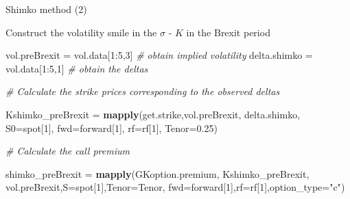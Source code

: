 \documentclass[ignorenonframetext,aspectratio=169]{beamer}
\newenvironment{Shaded}{}{}
\newcommand{\KeywordTok}[1]{\textcolor[rgb]{0.00,0.44,0.13}{\textbf{#1}}}
\newcommand{\DataTypeTok}[1]{\textcolor[rgb]{0.56,0.13,0.00}{#1}}
\newcommand{\DecValTok}[1]{\textcolor[rgb]{0.25,0.63,0.44}{#1}}
\newcommand{\FloatTok}[1]{\textcolor[rgb]{0.25,0.63,0.44}{#1}}
\newcommand{\StringTok}[1]{\textcolor[rgb]{0.25,0.44,0.63}{#1}}
\newcommand{\CommentTok}[1]{\textcolor[rgb]{0.38,0.63,0.69}{\textit{#1}}}
\newcommand{\OperatorTok}[1]{\textcolor[rgb]{0.40,0.40,0.40}{#1}}
\newcommand{\NormalTok}[1]{#1}
\begin{document}
\begin{frame}[fragile]{Shimko method (2)}

Construct the volatility smile in the \(\sigma\) - \(K\) in the Brexit
period

\begin{Shaded}
\begin{Highlighting}[]
\NormalTok{vol.preBrexit =}\StringTok{ }\NormalTok{vol.data[}\DecValTok{1}\OperatorTok{:}\DecValTok{5}\NormalTok{,}\DecValTok{3}\NormalTok{]         }\CommentTok{# obtain implied volatility}
\NormalTok{delta.shimko =}\StringTok{ }\NormalTok{vol.data[}\DecValTok{1}\OperatorTok{:}\DecValTok{5}\NormalTok{,}\DecValTok{1}\NormalTok{]          }\CommentTok{# obtain the deltas}

\CommentTok{# Calculate the strike prices corresponding to the observed deltas}

\NormalTok{Kshimko_preBrexit =}\StringTok{ }\KeywordTok{mapply}\NormalTok{(get.strike,vol.preBrexit, }
\NormalTok{                           delta.shimko, }\DataTypeTok{S0=}\NormalTok{spot[}\DecValTok{1}\NormalTok{], }
                           \DataTypeTok{fwd=}\NormalTok{forward[}\DecValTok{1}\NormalTok{], }\DataTypeTok{rf=}\NormalTok{rf[}\DecValTok{1}\NormalTok{], }\DataTypeTok{Tenor=}\FloatTok{0.25}\NormalTok{)}

\CommentTok{# Calculate the call premium}

\NormalTok{shimko_preBrexit =}\StringTok{ }\KeywordTok{mapply}\NormalTok{(GKoption.premium, Kshimko_preBrexit, }
\NormalTok{                          vol.preBrexit,}\DataTypeTok{S=}\NormalTok{spot[}\DecValTok{1}\NormalTok{],}\DataTypeTok{Tenor=}\NormalTok{Tenor,}
                          \DataTypeTok{fwd=}\NormalTok{forward[}\DecValTok{1}\NormalTok{],}\DataTypeTok{rf=}\NormalTok{rf[}\DecValTok{1}\NormalTok{],}\DataTypeTok{option_type=}\StringTok{"c"}\NormalTok{)}
\end{Highlighting}
\end{Shaded}

\end{frame}
\end{document}
